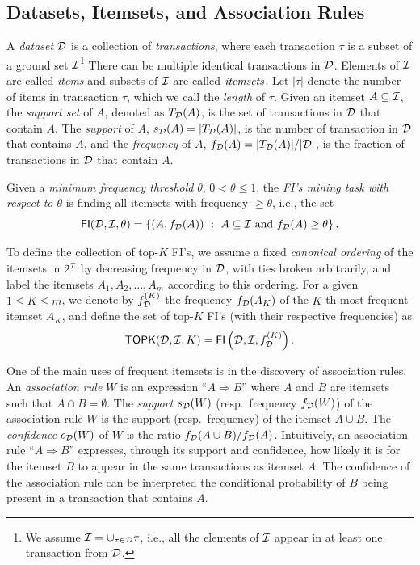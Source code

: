 \subsection{Datasets, Itemsets, and Association Rules}\label{sec:preldm}
A
\emph{dataset} ${\cal D}$ is a collection of \emph{transactions}, where each
transaction $\tau$ is a subset of a ground set ${\cal I}$\footnote{We assume
${\cal I}=\cup_{\tau\in{\cal D}} \tau$, i.e., all the elements of ${\cal I}$ appear in at
least one transaction from ${\cal D}$.} There can be multiple
identical transactions in ${\cal D}$. Elements of ${\cal I}$ are called \emph{items} and
subsets of ${\cal I}$ are called $\emph{itemsets}$. Let $|\tau|$ denote the number
of items in transaction $\tau$, which we call the \emph{length} of $\tau$. Given
an itemset $A\subseteq{\cal I}$, the \emph{support set} of $A$, denoted as
$T_{\cal D}(A)$, is the set of transactions in ${\cal D}$ that contain $A$. The
\emph{support} of $A$, $s_{\cal D}(A) =|T_{\cal D}(A)|$, is the number of transaction
in ${\cal D}$ that contains $A$, and the \emph{frequency} of $A$, $f_{\cal D}(A)=
|T_{\cal D}(A)|/|{\cal D}|$, is the fraction of transactions in ${\cal D}$ that contain
$A$.
\begin{definition}\label{def:vcmineminethreshold}
  Given a \emph{minimum frequency
  threshold} $\theta$, $0<\theta\le 1$, the \emph{FI's mining task with respect
  to $\theta$} is finding all itemsets with frequency $\geq\theta$, i.e., the
  set 
  \[ \mathsf{FI}({\cal D},{\cal I},\theta)=\left\{(A,f_{\cal D}(A)) ~:~ A \subseteq{\cal I} \mbox{ and }
  f_{{\cal D}}(A)\ge \theta\right\}.  \]
\end{definition}
  To define the collection of top-$K$ FI's, we assume a fixed \textit{canonical
  ordering} of the itemsets in $2^{\cal I}$ by decreasing frequency in ${\cal D}$, with
  ties broken arbitrarily, and label the itemsets $A_1,A_2,\dotsc,A_m$ according
  to this ordering.  For a given $1 \leq K \leq m$, we denote by
  $f^{(K)}_{\cal D}$ the frequency $f_{\cal D}(A_K)$ of the $K$-th most frequent itemset
  $A_K$, and define the set of top-$K$ FI's  (with their respective frequencies)
  as \[
  \mathsf{TOPK}({\cal D},{\cal I},K)= \mathsf{FI}\left({\cal D},{\cal I},f^{(K)}_{\cal D}\right).  \]

One of the main uses of frequent itemsets is in the discovery of
association rules.
An \emph{association rule} $W$ is an expression
  ``$A\Rightarrow B$'' where $A$ and $B$ are itemsets such that $A\cap
  B=\emptyset$. The \emph{support} $s_{\cal D}(W)$ (resp.~frequency $f_{\cal D}(W)$)
  of the association rule $W$ is the support (resp.~frequency) of the itemset
  $A\cup B$. The \emph{confidence} $c_{\cal D}(W)$ of $W$ is the ratio $f_{\cal D}(A \cup
  B)/f_{\cal D}(A)$. %
Intuitively, an association rule ``$A\Rightarrow B$'' expresses, through its
support and confidence, how likely it is for the itemset $B$ to appear in the
same transactions as itemset $A$. The confidence of the association rule
can be interpreted the conditional probability of $B$ being present in a transaction that 
contains $A$.

